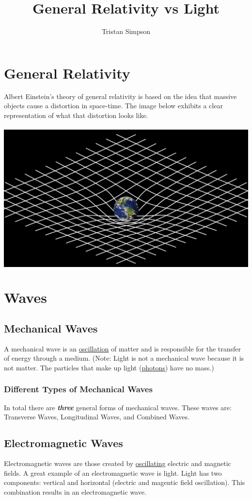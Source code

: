 \documentclass{article}
\title{General Relativity vs Light}
\author{Tristan Simpson}
\begin{document}
\maketitle
\tableofcontents
\section{General Relativity}\label{sec:generalrelativity}
Albert Einstein's theory of general relativity is based on the idea that massive objects cause a distortion in space-time. The image below exhibits a clear representation of what that distortion looks like.\\\\
\includegraphics[scale=0.30]{images/general_relativity.png}

\section{Waves}
\subsection{Mechanical Waves}
A mechanical wave is an \hyperref[sec:oscillation]{oscillation} of matter and is responsible for the transfer of energy through a medium. (Note: Light is not a mechanical wave because it is not matter. The particles that make up light (\hyperref[sec:photons]{photons}) have no mass.)
\subsubsection{Different Types of Mechanical Waves}
In total there are \textbf{\textit{three}} general forms of mechanical waves. These waves are: Transverse Waves, Longitudinal Waves, and Combined Waves.
\subsection{Electromagnetic Waves}
Electromagnetic waves are those created by \hyperref[sec:oscillation]{oscillating} electric and magnetic fields. A great example of an electromagnetic wave is light. Light has two components: vertical and horizontal (electric and magentic field oscillation). This combination results in an electromagnetic wave.
\end{document}
